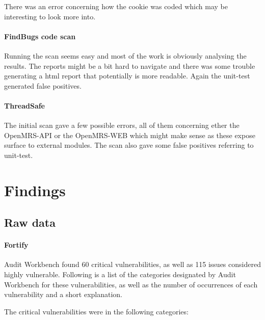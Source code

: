 \documentclass{report} %
\begin{document}
  There was an error concerning how the cookie was coded which may be
  interesting to look more into.

\paragraph{FindBugs code scan}

  Running the scan seems easy and most of the work is obviously analysing the
  results. The reports might be a bit hard to navigate and there was some
  trouble generating a html report that potentially is more readable. Again the
  unit-test generated false positives.

\paragraph{ThreadSafe} %

The initial scan gave a few possible errors, all of them concerning ether the
OpenMRS-API or the OpenMRS-WEB which might make sense as these expose surface to
external modules. The scan also gave some false positives referring to
unit-test.
  
  \newpage

\section{Findings}

\subsection{Raw data}

\paragraph{Fortify}

  Audit Workbench found 60 critical vulnerabilities, as well as 115 issues
  considered highly vulnerable. Following is a list of the categories designated
  by Audit Workbench for these vulnerabilities, as well as the number of
  occurrences of each vulnerability and a short explanation.

  The critical vulnerabilities were in the
  following categories:
  
\end{document}
